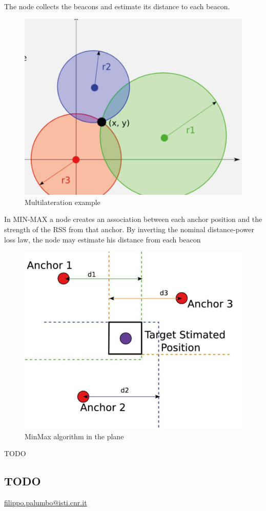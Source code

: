 The node collects the beacons and estimate its distance to each beacon.

\begin{figure}[htbp]
   \centering
   \includegraphics{images/multilateration.png}
   \caption{Multilateration example}
   \label{fig:multilateration}
\end{figure}
\nl

In MIN-MAX a node creates an association between each anchor position and the strength of the RSS from that anchor.
By inverting the nominal distance-power loss law, the node may estimate his distance from each beacon
\begin{figure}[htbp]
   \centering
   \includegraphics{images/minmax.png}
   \caption{MinMax algorithm in the plane}
   \label{fig:minmax}
\end{figure}

TODO

\subsection{TODO}

\href{filippo.palumbo@isti.cnr.it}{filippo.palumbo@isti.cnr.it}

